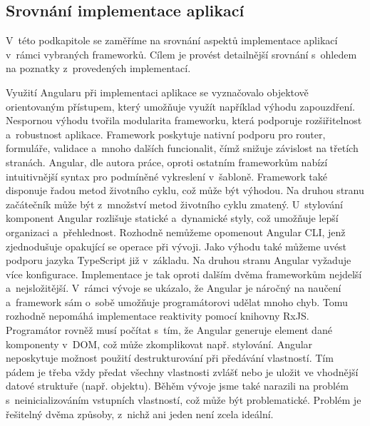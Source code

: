 



\subsection{Srovnání implementace aplikací}

V~této podkapitole se zaměříme na srovnání aspektů implementace aplikací v~rámci vybraných frameworků. 
Cílem je provést detailnější srovnání s~ohledem na poznatky z~provedených implementací. 

Využití Angularu při implementaci aplikace se vyznačovalo objektově orientovaným přístupem, který umožňuje využít například výhodu zapouzdření. 
Nespornou výhodu tvořila modularita frameworku, která podporuje rozšiřitelnost a~robustnost aplikace. 
Framework poskytuje nativní podporu pro router, formuláře, validace a~mnoho dalších funcionalit, čímž snižuje závislost na třetích stranách. 
Angular, dle autora práce, oproti ostatním frameworkům nabízí intuitivnější syntax pro podmíněné vykreslení v~šabloně. 
Framework také disponuje řadou metod životního cyklu, což může být výhodou. Na druhou stranu začátečník může být z~množství metod životního cyklu zmatený. 
U~stylování komponent Angular rozlišuje statické a~dynamické styly, což umožňuje lepší organizaci a~přehlednost. 
Rozhodně nemůžeme opomenout Angular CLI, jenž zjednodušuje opakující se operace při vývoji. 
Jako výhodu také můžeme uvést podporu jazyka TypeScript již v~základu. 
Na druhou stranu Angular vyžaduje více konfigurace. Implementace je tak oproti dalším dvěma frameworkům nejdelší a~nejsložitější. 
V~rámci vývoje se ukázalo, že Angular je náročný na naučení a~framework sám o~sobě umožňuje programátorovi udělat mnoho chyb. 
Tomu rozhodně nepomáhá implementace reaktivity pomocí knihovny RxJS. 
Programátor rovněž musí počítat s~tím, že Angular generuje element dané komponenty v~DOM, což může zkomplikovat např. stylování. 
Angular neposkytuje možnost použití destrukturování při předávání vlastností. 
Tím pádem je třeba vždy předat všechny vlastnosti zvlášť nebo je uložit ve vhodnější datové struktuře (např. objektu).
Běhěm vývoje jsme také narazili na problém s~neinicializováním vstupních vlastností, což může být problematické. 
Problém je řešitelný dvěma způsoby, z~nichž ani jeden není zcela ideální.


